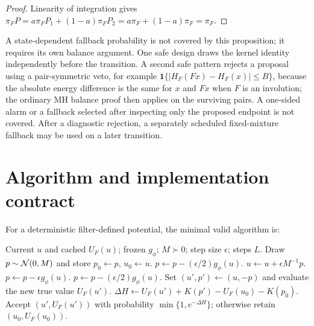 \begin{proof}
Linearity of integration gives
$\pi_FP=a\pi_FP_1+(1-a)\pi_FP_2=a\pi_F+(1-a)\pi_F=\pi_F$.
\end{proof}

A state-dependent fallback probability is not covered by this proposition; it
requires its own balance argument.  One safe design draws the kernel identity
independently before the transition.  A second safe pattern rejects a proposal
using a pair-symmetric veto, for example
$\mathbf1\{|H_F(Fx)-H_F(x)|\le B\}$, because the absolute energy difference is
the same for $x$ and $Fx$ when $F$ is an involution; the ordinary MH balance
proof then applies on the surviving pairs.  A one-sided alarm or a fallback
selected after inspecting only the proposed endpoint is not covered.  After a
diagnostic rejection, a separately scheduled fixed-mixture fallback may be
used on a later transition.

\section{Algorithm and implementation contract}
\label{sec:bf-hnn-algorithm}

For a deterministic filter-defined potential, the minimal valid algorithm is:

\begin{algorithm}[htbp]
\caption{True-energy-corrected neural-force HMC}
\label{alg:bf-hnn-safe-hmc}
\begin{algorithmic}[1]
\Require Current $u$ and cached $U_F(u)$; frozen $g_\phi$; $M\succ0$;
         step size $\epsilon$; steps $L$.
\State Draw $p\sim\mathcal{N}(0,M)$ and store $p_0\gets p$, $u_0\gets u$.
\State $p\gets p-(\epsilon/2)g_\phi(u)$.
  \State $u\gets u+\epsilon M^{-1}p$.
    \State $p\gets p-\epsilon g_\phi(u)$.
  \EndIf
\EndFor
\State $p\gets p-(\epsilon/2)g_\phi(u)$.
\State Set $(u',p')\gets(u,-p)$ and evaluate the new true value $U_F(u')$.
\State $\Delta H\gets U_F(u')+K(p')-U_F(u_0)-K(p_0)$.
\State Accept $(u',U_F(u'))$ with probability $\min\{1,e^{-\Delta H}\}$;
       otherwise retain $(u_0,U_F(u_0))$.
\end{algorithmic}
\end{algorithm}

